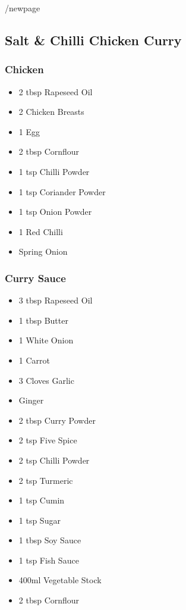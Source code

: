 \documentclass[11pt, english]{article}
\begin{document}
/newpage

	\subsection{Salt \& Chilli Chicken Curry}

		\subsubsection*{Chicken}

	\begin{itemize}
        \setlength\itemsep{0cm}
                \item 2 tbsp Rapeseed Oil
		\item 2 Chicken Breasts
		\item 1 Egg
		\item 2 tbsp Cornflour
		\item 1 tsp Chilli Powder
		\item 1 tsp Coriander Powder
		\item 1 tsp Onion Powder
		\item 1 Red Chilli
		\item Spring Onion
        \end{itemize}

		\subsubsection*{Curry Sauce}

	\begin{itemize}
        \setlength\itemsep{0cm}
                \item 3 tbsp Rapeseed Oil
		\item 1 tbsp Butter
		\item 1 White Onion
		\item 1 Carrot
		\item 3 Cloves Garlic
		\item Ginger
		\item 2 tbsp Curry Powder
		\item 2 tsp Five Spice
		\item 2 tsp Chilli Powder
		\item 2 tsp Turmeric
		\item 1 tsp Cumin
		\item 1 tsp Sugar
		\item 1 tbsp Soy Sauce
		\item 1 tsp Fish Sauce
		\item 400ml Vegetable Stock
		\item 2 tbsp Cornflour
        \end{itemize}
\end{document}
